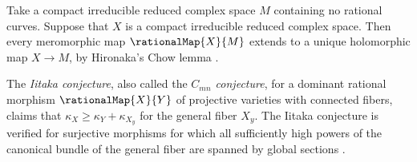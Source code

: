 Take a compact irreducible reduced complex space $M$ containing no rational curves.
Suppose that $X$ is a compact irreducible reduced complex space. Then every meromorphic map $\rationalMap{X}{M}$ extends to a unique holomorphic map $X \to M$, by Hironaka's Chow lemma \cite[Corollary~2.9]{Grauert:1994}.

The \emph{Iitaka conjecture}, also called the \emph{$C_{mn}$ conjecture}, for a dominant rational morphism $\rationalMap{X}{Y}$ of projective varieties with connected fibers, claims that $\kappa_X \ge \kappa_Y + \kappa_{X_y}$ for the general fiber $X_y$.
The Iitaka conjecture is verified for surjective morphisms for which all sufficiently high powers of the canonical bundle of the general fiber are spanned by global sections \cite[Corollary~1.2]{Kawamata:1985}.

